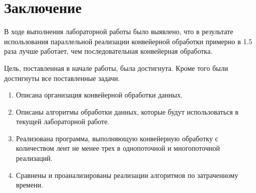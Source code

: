 \chapter*{Заключение}

В ходе выполнения лабораторной работы было выявлено, что в результате использования параллельной реализации конвейерной обработки примерно в 1.5 раза лучше работает, чем последовательная конвейерная обработка.

Цель, поставленная в начале работы, была достигнута. 
Кроме того были достигнуты все поставленные задачи.
\begin{enumerate}
	\item Описана организация конвейерной обработки данных.
	\item Описаны алгоритмы обработки данных, которые будут использоваться в текущей лабораторной работе.
	\item Реализована программа, выполняющую конвейерную обработку с количеством лент не менее трех в однопоточной и многопоточной реализаций.
	\item Сравнены и проанализированы реализации алгоритмов по затраченному времени.
\end{enumerate}